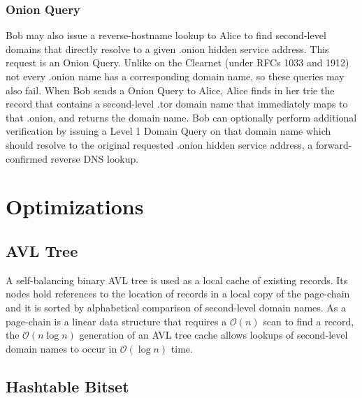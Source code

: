 \subsubsection{Onion Query}

Bob may also issue a reverse-hostname lookup to Alice to find second-level domains that directly resolve to a given .onion hidden service address. This request is an Onion Query. Unlike on the Clearnet (under RFCs 1033 and 1912) not every .onion name has a corresponding domain name, so these queries may also fail. When Bob sends a Onion Query to Alice, Alice finds in her trie the record that contains a second-level .tor domain name that immediately maps to that .onion, and returns the domain name. Bob can optionally perform additional verification by issuing a Level 1 Domain Query on that domain name which should resolve to the original requested .onion hidden service address, a forward-confirmed reverse DNS lookup.







\section{Optimizations}

\subsection{AVL Tree}
\label{sec:AVLTree}

A self-balancing binary AVL tree is used as a local cache of existing records. Its nodes hold references to the location of records in a local copy of the page-chain and it is sorted by alphabetical comparison of second-level domain names. As a page-chain is a linear data structure that requires a $ \mathcal{O}(n) $ scan to find a record, the $ \mathcal{O}(n\log{}n) $ generation of an AVL tree cache allows lookups of second-level domain names to occur in $ \mathcal{O}(\log{}n) $ time.





\subsection{Hashtable Bitset}

